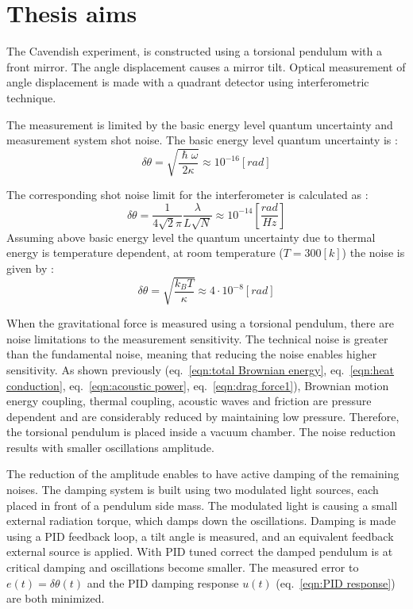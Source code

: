 \documentclass[\main/master.tex]{subfiles}
\begin{document}
\chapter{Thesis aims}\label{chapter:Thesis aims}

The Cavendish experiment, is constructed using a torsional pendulum with a front mirror. The angle displacement causes a mirror tilt. Optical measurement of angle displacement is made with a quadrant detector using interferometric technique.
\par\noindent
The measurement is limited by the basic energy level quantum uncertainty and measurement system shot noise. The basic energy level quantum uncertainty is \cite{howell2019}:
\begin{equation}
\delta\theta= \sqrt{\frac{\hslash\omega}{2\kappa}} \approx 10^{-16} [rad]    \label{eqn:basic uncertainty}
\end{equation}
\par\noindent
The corresponding shot noise limit for the interferometer is calculated as \cite{howell2019}:
\begin{equation}
\delta\theta = \frac{1}{4\sqrt{2}\pi}\frac{\lambda}{L\sqrt{N}} \approx
10^{-14} [\frac{rad}{Hz}]    \label{eqn:shot limit}
\end{equation}
Assuming above basic energy level the quantum uncertainty due to thermal energy is temperature dependent, at room temperature ($T = 300[k]$) the noise is given by \cite{howell2019}:
\begin{equation}
\delta\theta = \sqrt{\frac{k_B T}{\kappa}} \approx 4\cdot 10^{-8} [rad] \label{eqn:Brownian uncertainty 3}
\end{equation}
\par\noindent
When the gravitational force is measured using a torsional pendulum, there are noise limitations to the measurement sensitivity. The technical noise is greater than the fundamental noise, meaning that reducing the noise enables higher sensitivity. As shown previously (eq.~\ref{eqn:total Brownian energy}, eq.~\ref{eqn:heat conduction}, eq.~\ref{eqn:acoustic power}, eq.~\ref{eqn:drag force1}), Brownian motion energy coupling, thermal coupling, acoustic waves and friction are pressure dependent and are considerably reduced by maintaining low pressure. Therefore, the torsional pendulum is placed inside a vacuum chamber. The noise reduction results with smaller oscillations amplitude.
\par\noindent
The reduction of the amplitude enables to have active damping of the remaining noises. The damping system is built using two modulated light sources, each placed in front of a pendulum side mass. The modulated light is causing a small external radiation torque, which damps down the oscillations. Damping is made using a PID feedback loop, a tilt angle is measured, and an equivalent feedback external source is applied. With PID tuned correct the damped pendulum is at critical damping and oscillations become smaller. The measured error to $e(t) = \delta\theta(t)$ and the PID damping response $u(t)$ (eq.~\ref{eqn:PID response}) are both minimized. 
\end{document}
